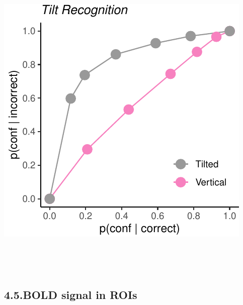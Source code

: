 \documentclass[
]{article}
\begin{document}
\includegraphics{Chudi-Thesis-2020_files/figure-latex/unnamed-chunk-6-3.pdf}

~

~

\hypertarget{bold-signal-in-rois}{%
\subsection{4.5.BOLD signal in ROIs}\label{bold-signal-in-rois}}
\end{document}
